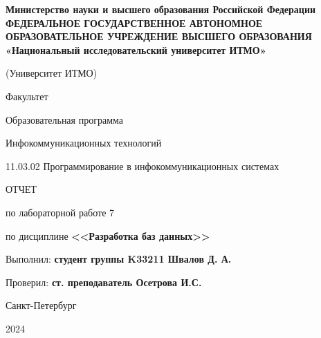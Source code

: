 \documentclass[a4paper, 14pt]{extarticle}
\begin{document}
\begin{titlepage}
  \vspace{0pt plus2fill}
  \noindent

  \vspace{0pt plus6fill}
  \begin{center}
    {
    \bfseries
    Министерство науки и высшего образования Российской Федерации
    {
    \scriptsize
    ФЕДЕРАЛЬНОЕ ГОСУДАРСТВЕННОЕ АВТОНОМНОЕ ОБРАЗОВАТЕЛЬНОЕ УЧРЕЖДЕНИЕ ВЫСШЕГО
    ОБРАЗОВАНИЯ
    }
    «Национальный исследовательский университет ИТМО»

    (Университет ИТМО)

    \begin{minipage}[t]{0.42\textwidth}
      \vspace*{0pt}
      \begin{flushright}
        Факультет

        Образовательная программа
      \end{flushright}
    \end{minipage}
    \begin{minipage}[t]{0.57\textwidth}
      \vspace*{0pt}
      \begin{flushright}
        Инфокоммуникационных технологий

        11.03.02 Программирование в инфокоммуникационных системах
      \end{flushright}
    \end{minipage}
    }

    \vspace{0pt plus5fill}

    \LARGE{
      ОТЧЕТ

      по лабораторной работе 7

      по дисциплине \textbf{<<Разработка баз данных>>}
    }
  \end{center}

  \vspace{0pt plus4fill}
  \begin{flushright}
    Выполнил: \textbf{студент группы K33211 Швалов Д. А.}

    Проверил: \textbf{ст. преподаватель Осетрова И.С.}
  \end{flushright}

  \vspace{0pt plus8fill}
  \begin{center}
    Санкт-Петербург

    2024
  \end{center}
\end{titlepage}
\end{document}
